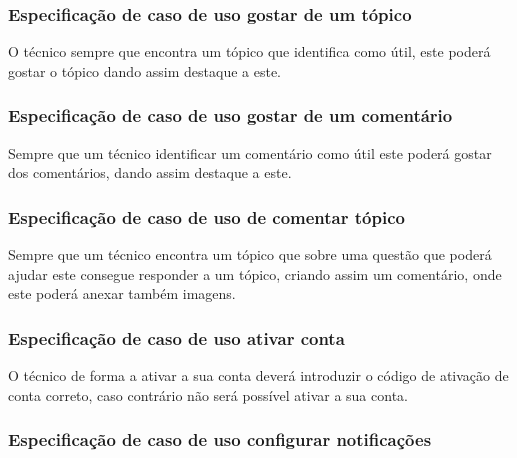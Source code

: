 

\newpage

\subsubsection{Especificação de caso de uso gostar de um tópico}

O técnico sempre que encontra um tópico que identifica como útil, este poderá gostar o tópico dando assim 
destaque a este.




\subsubsection{Especificação de caso de uso gostar de um comentário}

Sempre que um técnico identificar um comentário como útil este poderá gostar dos comentários, dando 
assim destaque a este.



\newpage

\subsubsection{Especificação de caso de uso de comentar tópico}

Sempre que um técnico encontra um tópico que sobre uma questão que poderá ajudar este consegue responder 
a um tópico, criando assim um comentário, onde este poderá anexar também imagens.



\newpage

\subsubsection{Especificação de caso de uso ativar conta}

O técnico de forma a ativar a sua conta deverá introduzir o código de ativação de conta correto, 
caso contrário não será possível ativar a sua conta.



\newpage

\subsubsection{Especificação de caso de uso configurar notificações}

